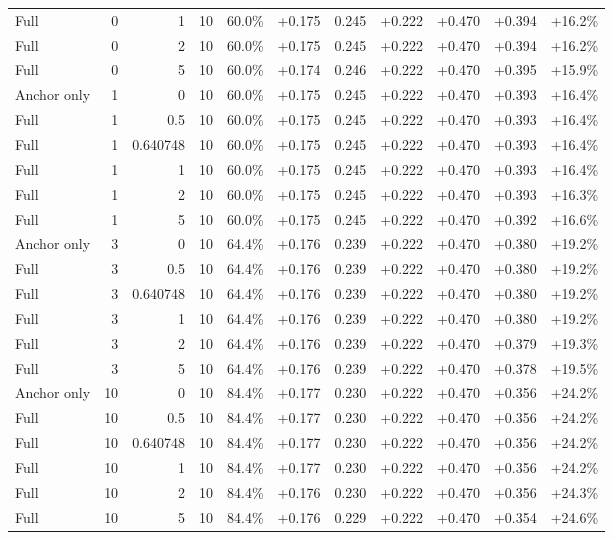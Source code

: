 \begin{table}[htbp]
\begin{tabular}{lrrrccccccc}
Full & 0 & 1 & 10 & 60.0\% & +0.175 & 0.245 & +0.222 & +0.470 & +0.394 & +16.2\% \\
Full & 0 & 2 & 10 & 60.0\% & +0.175 & 0.245 & +0.222 & +0.470 & +0.394 & +16.2\% \\
Full & 0 & 5 & 10 & 60.0\% & +0.174 & 0.246 & +0.222 & +0.470 & +0.395 & +15.9\% \\
Anchor only & 1 & 0 & 10 & 60.0\% & +0.175 & 0.245 & +0.222 & +0.470 & +0.393 & +16.4\% \\
Full & 1 & 0.5 & 10 & 60.0\% & +0.175 & 0.245 & +0.222 & +0.470 & +0.393 & +16.4\% \\
Full & 1 & 0.640748 & 10 & 60.0\% & +0.175 & 0.245 & +0.222 & +0.470 & +0.393 & +16.4\% \\
Full & 1 & 1 & 10 & 60.0\% & +0.175 & 0.245 & +0.222 & +0.470 & +0.393 & +16.4\% \\
Full & 1 & 2 & 10 & 60.0\% & +0.175 & 0.245 & +0.222 & +0.470 & +0.393 & +16.3\% \\
Full & 1 & 5 & 10 & 60.0\% & +0.175 & 0.245 & +0.222 & +0.470 & +0.392 & +16.6\% \\
Anchor only & 3 & 0 & 10 & 64.4\% & +0.176 & 0.239 & +0.222 & +0.470 & +0.380 & +19.2\% \\
Full & 3 & 0.5 & 10 & 64.4\% & +0.176 & 0.239 & +0.222 & +0.470 & +0.380 & +19.2\% \\
Full & 3 & 0.640748 & 10 & 64.4\% & +0.176 & 0.239 & +0.222 & +0.470 & +0.380 & +19.2\% \\
Full & 3 & 1 & 10 & 64.4\% & +0.176 & 0.239 & +0.222 & +0.470 & +0.380 & +19.2\% \\
Full & 3 & 2 & 10 & 64.4\% & +0.176 & 0.239 & +0.222 & +0.470 & +0.379 & +19.3\% \\
Full & 3 & 5 & 10 & 64.4\% & +0.176 & 0.239 & +0.222 & +0.470 & +0.378 & +19.5\% \\
Anchor only & 10 & 0 & 10 & 84.4\% & +0.177 & 0.230 & +0.222 & +0.470 & +0.356 & +24.2\% \\
Full & 10 & 0.5 & 10 & 84.4\% & +0.177 & 0.230 & +0.222 & +0.470 & +0.356 & +24.2\% \\
Full & 10 & 0.640748 & 10 & 84.4\% & +0.177 & 0.230 & +0.222 & +0.470 & +0.356 & +24.2\% \\
Full & 10 & 1 & 10 & 84.4\% & +0.177 & 0.230 & +0.222 & +0.470 & +0.356 & +24.2\% \\
Full & 10 & 2 & 10 & 84.4\% & +0.176 & 0.230 & +0.222 & +0.470 & +0.356 & +24.3\% \\
Full & 10 & 5 & 10 & 84.4\% & +0.176 & 0.229 & +0.222 & +0.470 & +0.354 & +24.6\% \\

\end{tabular}
\end{table}
